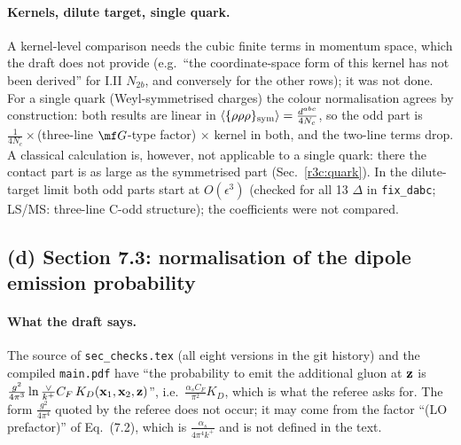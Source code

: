 \paragraph{Kernels, dilute target, single quark.} A kernel-level comparison needs the cubic finite terms in momentum space, which the draft does not provide (e.g.\ ``the coordinate-space form of this kernel has not been derived'' for I.II $N_{2b}$, and conversely for the other rows); it was not done. For a single quark (Weyl-symmetrised charges) the colour normalisation agrees by construction: both results are linear in $\langle\{\rho\rho\rho\}_{\rm sym}\rangle=\frac{d^{abc}}{4N_c}$, so the odd part is $\frac{1}{4N_c}\times$(three-line $\mf G$-type factor) $\times$ kernel in both, and the two-line terms drop. A classical calculation is, however, not applicable to a single quark: there the contact part is as large as the symmetrised part (Sec.~\ref{r3c:quark}). In the dilute-target limit both odd parts start at $O(\epsilon^3)$ (checked for all 13 $\Delta$ in \texttt{fix\_dabc}; LS/MS: three-line C-odd structure); the coefficients were not compared.

\subsection{(d) Section 7.3: normalisation of the dipole emission probability}\label{r3c:d}
\paragraph{What the draft says.} The source of \texttt{sec\_checks.tex} (all eight versions in the git history) and the compiled \texttt{main.pdf} have ``the probability to emit the additional gluon at $\mathbf{z}$ is $\frac{g^2}{4\pi^3}\ln\frac{\vee}{k^+}C_F\,K_D(\mathbf{x}_1,\mathbf{x}_2,\mathbf{z})$'', i.e.\ $\frac{\alpha_sC_F}{\pi^2}K_D$, which is what the referee asks for. The form $\frac{g^2}{4\pi^4}$ quoted by the referee does not occur; it may come from the factor ``(LO prefactor)'' of Eq.~(7.2), which is $\frac{\alpha_s}{4\pi^4k^+}$ and is not defined in the text.
